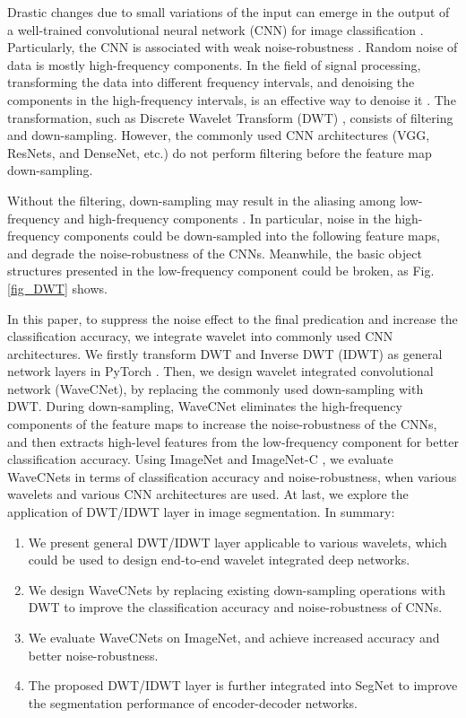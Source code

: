 \documentclass[10pt,twocolumn,letterpaper]{article}
\begin{document}
Drastic changes due to small variations of the input
can emerge in the output of a well-trained convolutional neural network (CNN) for image classification
\cite{goodfellow2014explaining, xie2019feature, geirhos2018imagenet}.
Particularly, the CNN is associated with weak noise-robustness \cite{hendrycks2019benchmarking}.
Random noise of data is mostly high-frequency components.
In the field of signal processing,
transforming the data into different frequency intervals,
and denoising the components in the high-frequency intervals,
is an effective way to denoise it \cite{donoho1995noising,donoho1994ideal}.
The transformation,
such as Discrete Wavelet Transform (DWT) \cite{mallat1989theory},
consists of filtering and down-sampling.
However, the commonly used CNN architectures (VGG, ResNets, and DenseNet, etc.)
do not perform filtering before the feature map down-sampling.

Without the filtering, down-sampling may result in the aliasing among low-frequency and high-frequency components
\cite{nyquist1928certain,zhang2019making}.
In particular, noise in the high-frequency components could be down-sampled into the following feature maps,
and degrade the noise-robustness of the CNNs.
Meanwhile, the basic object structures presented in the low-frequency component could be broken, as Fig. \ref{fig_DWT} shows.

In this paper, to suppress the noise effect to the final predication and increase the classification accuracy,
we integrate wavelet into commonly used CNN architectures.
We firstly transform DWT and Inverse DWT (IDWT) as general network layers in PyTorch \cite{paszke2017automatic}.
Then, we design wavelet integrated convolutional network (WaveCNet),
by replacing the commonly used down-sampling with DWT.
During down-sampling, WaveCNet eliminates the high-frequency components of the feature maps
to increase the noise-robustness of the CNNs,
and then extracts high-level features from the low-frequency component for better classification accuracy.
Using ImageNet \cite{deng2009imagenet} and ImageNet-C \cite{hendrycks2019benchmarking},
we evaluate WaveCNets in terms of classification accuracy and noise-robustness, when various wavelets and various CNN architectures are used.
At last, we explore the application of DWT/IDWT layer in image segmentation.
In summary:
\begin{enumerate}
\setlength{\topsep}{-2ex}
\setlength{\itemsep}{-0.5ex}
\item We present general DWT/IDWT layer applicable to various wavelets, which could be used to design end-to-end wavelet integrated deep networks.
\item We design WaveCNets by replacing existing down-sampling operations with DWT
	  to improve the classification accuracy and noise-robustness of CNNs.
\item We evaluate WaveCNets on ImageNet,
	  and achieve increased accuracy and better noise-robustness.
\item The proposed DWT/IDWT layer is further integrated into SegNet \cite{badrinarayanan2017segnet}
	  to improve the segmentation performance of encoder-decoder networks.
\end{enumerate}
\end{document}
